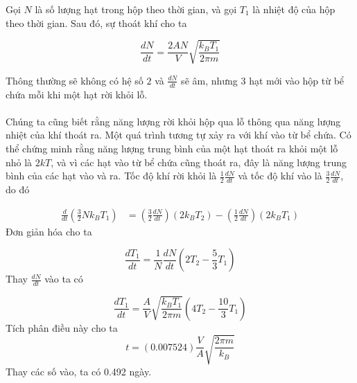 \begin{solution}
Gọi $N$ là số lượng hạt trong hộp theo thời gian, và gọi $T_1$ là nhiệt độ của hộp theo thời gian. Sau đó, sự thoát khí cho ta

\begin{equation}
    \frac{dN}{dt}=\frac{2AN}{V}\sqrt{\frac{k_BT_1}{2\pi m}}
\end{equation}

Thông thường sẽ không có hệ số $2$ và $\frac{dN}{dt}$ sẽ âm, nhưng $3$ hạt mới vào hộp từ bể chứa mỗi khi một hạt rời khỏi lỗ. \\
\\
Chúng ta cũng biết rằng năng lượng rời khỏi hộp qua lỗ thông qua năng lượng nhiệt của khí thoát ra. Một quá trình tương tự xảy ra với khí vào từ bể chứa. Có thể chứng minh rằng năng lượng trung bình của một hạt thoát ra khỏi một lỗ nhỏ là $2kT$, và vì các hạt vào từ bể chứa cũng thoát ra, đây là năng lượng trung bình của các hạt vào và ra. Tốc độ khí rời khỏi là $\frac{1}{2}\frac{dN}{dt}$ và tốc độ khí vào là $\frac{3}{2}\frac{dN}{dt}$, do đó

\begin{align}
    \frac{d}{dt}\left(\frac{3}{2}Nk_BT_1\right)&=\left(\frac{3}{2}\frac{dN}{dt}\right)(2k_BT_2)-\left(\frac{1}{2}\frac{dN}{dt}\right)(2k_BT_1)
\end{align}
    Đơn giản hóa cho ta 

    \begin{equation}
        \frac{dT_1}{dt}=\frac{1}{N}\frac{dN}{dt}\left(2T_2-
        \frac{5}{3}T_1\right)
    \end{equation}
    Thay $\frac{dN}{dt}$ vào ta có

    \begin{equation}
        \frac{dT_1}{dt}=\frac{A}{V}\sqrt{\frac{k_BT_1}{2\pi m}}\left(4T_2-\frac{10}{3}T_1\right)
    \end{equation}
    Tích phân điều này cho ta
    \begin{equation}
        t=(0.007524)\frac{V}{A}\sqrt{\frac{2\pi m}{k_B}}
    \end{equation}
    Thay các số vào, ta có 0.492 ngày. 
    
\end{solution}
